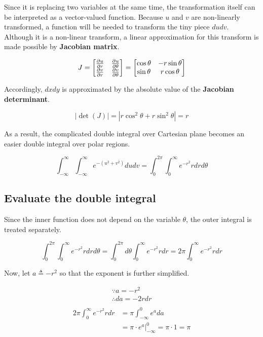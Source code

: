 Since it is replacing two variables at the same time, the transformation itself
can be interpreted as a vector-valued function. Because $u$ and $v$ are
non-linearly transformed, a function will be needed to transform the tiny piece
$dudv$. Although it is a non-linear transform, a linear approximation for this
transform is made possible by \textbf{Jacobian matrix}.

$$
J=
\begin{bmatrix}
	{\partial u\over\partial r} & {\partial u\over\partial\theta} \\
	{\partial v\over\partial r} & {\partial v\over\partial\theta}
\end{bmatrix}
=
\begin{bmatrix}
	\cos\theta & -r\sin\theta \\
	\sin\theta & r\cos\theta
\end{bmatrix}
$$

Accordingly, $dxdy$ is approximated by the absolute value of the
\textbf{Jacobian determinant}.

$$
\left|\det(J)\right|=\left|r\cos^2\theta+r\sin^2\theta\right|=r
$$

As a result, the complicated double integral over Cartesian plane becomes an
easier double integral over polar regions.

$$
\int_{-\infty}^\infty\int_{-\infty}^\infty e^{-(u^2+v^2)}dudv
=\int_0^{2\pi}\int_0^\infty e^{-r^2}rdrd\theta
$$

\pagebreak
\subsection{Evaluate the double integral}

Since the inner function does not depend on the variable $\theta$, the outer
integral is treated separately.

$$
\int_0^{2\pi}\int_0^\infty e^{-r^2}rdrd\theta
=\int_0^{2\pi}d\theta\int_0^\infty e^{-r^2}rdr=2\pi\int_0^\infty e^{-r^2}rdr
$$

Now, let $a\triangleq-r^2$ so that the exponent is further simplified.

$$
\begin{aligned}
	\because a=-r^2 \\
	\therefore da=-2rdr \\
\end{aligned}
$$
$$
\begin{aligned}
	2\pi\int_0^\infty e^{-r^2}rdr
	&=\pi\int_{-\infty}^0 e^ada \\
	&=\pi\cdot\left.e^a\right|_{-\infty}^0=\pi\cdot1=\pi
\end{aligned}
$$

